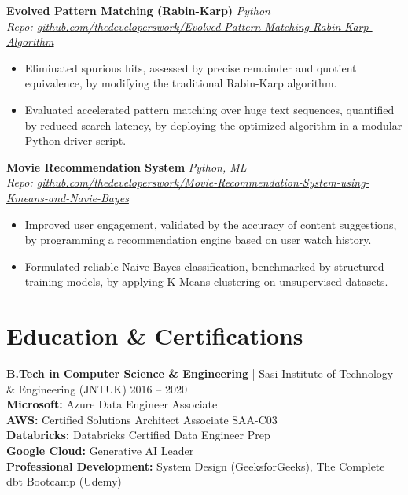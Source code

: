 \documentclass[10pt, letterpaper]{article}
\begin{document}
\noindent \textbf{Evolved Pattern Matching (Rabin-Karp)} \hfill \textit{Python} \\
\textit{Repo: \href{https://github.com/thedeveloperswork/Evolved-Pattern-Matching-Rabin-Karp-Algorithm}{github.com/thedeveloperswork/Evolved-Pattern-Matching-Rabin-Karp-Algorithm}}
\begin{itemize}[leftmargin=0.25in, itemsep=1pt]
    \item Eliminated spurious hits, assessed by precise remainder and quotient equivalence, by modifying the traditional Rabin-Karp algorithm.
    \item Evaluated accelerated pattern matching over huge text sequences, quantified by reduced search latency, by deploying the optimized algorithm in a modular Python driver script.
\end{itemize}

\vspace{2pt}

\noindent \textbf{Movie Recommendation System} \hfill \textit{Python, ML} \\
\textit{Repo: \href{https://github.com/thedeveloperswork/Movie-Recommendation-System-using-Kmeans-and-Navie-Bayes}{github.com/thedeveloperswork/Movie-Recommendation-System-using-Kmeans-and-Navie-Bayes}}
\begin{itemize}[leftmargin=0.25in, itemsep=1pt]
    \item Improved user engagement, validated by the accuracy of content suggestions, by programming a recommendation engine based on user watch history.
    \item Formulated reliable Naive-Bayes classification, benchmarked by structured training models, by applying K-Means clustering on unsupervised datasets.
\end{itemize}

\section{Education \& Certifications}
\noindent \textbf{B.Tech in Computer Science \& Engineering} | Sasi Institute of Technology \& Engineering (JNTUK) \hfill 2016 -- 2020 \\
\textbf{Microsoft:} Azure Data Engineer Associate \\
\textbf{AWS:} Certified Solutions Architect Associate SAA-C03 \\
\textbf{Databricks:} Databricks Certified Data Engineer Prep \\
\textbf{Google Cloud:} Generative AI Leader \\
\textbf{Professional Development:} System Design (GeeksforGeeks), The Complete dbt Bootcamp (Udemy)
\end{document}
